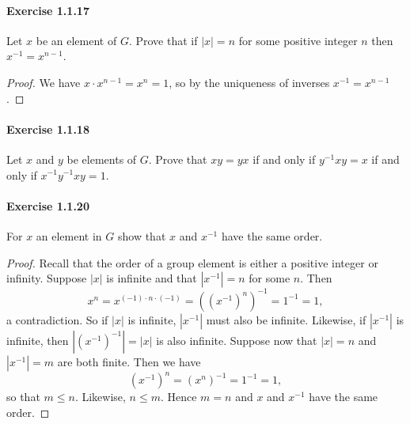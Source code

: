 \documentclass{article}
\theoremstyle{definition}
\begin{document}
\paragraph{Exercise 1.1.17} Let $x$ be an element of $G$. Prove that if $|x|=n$ for some positive integer $n$ then $x^{-1}=x^{n-1}$.
\begin{proof}
    We have $x \cdot x^{n-1}=x^n=1$, so by the uniqueness of inverses $x^{-1}=x^{n-1}$.
\end{proof}


\paragraph{Exercise 1.1.18} Let $x$ and $y$ be elements of $G$. Prove that $xy=yx$ if and only if $y^{-1}xy=x$ if and only if $x^{-1}y^{-1}xy=1$.


\paragraph{Exercise 1.1.20} For $x$ an element in $G$ show that $x$ and $x^{-1}$ have the same order.
\begin{proof}
    Recall that the order of a group element is either a positive integer or infinity.
Suppose $|x|$ is infinite and that $\left|x^{-1}\right|=n$ for some $n$. Then
$$
x^n=x^{(-1) \cdot n \cdot(-1)}=\left(\left(x^{-1}\right)^n\right)^{-1}=1^{-1}=1,
$$
a contradiction. So if $|x|$ is infinite, $\left|x^{-1}\right|$ must also be infinite. Likewise, if $\left|x^{-1}\right|$ is infinite, then $\left|\left(x^{-1}\right)^{-1}\right|=|x|$ is also infinite.
Suppose now that $|x|=n$ and $\left|x^{-1}\right|=m$ are both finite. Then we have
$$
\left(x^{-1}\right)^n=\left(x^n\right)^{-1}=1^{-1}=1,
$$
so that $m \leq n$. Likewise, $n \leq m$. Hence $m=n$ and $x$ and $x^{-1}$ have the same order.
\end{proof}
\end{document}

